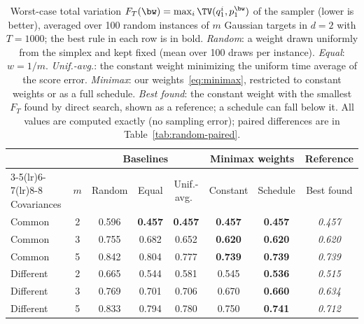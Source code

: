 \begin{table}[t]
\centering
\small
\setlength{\tabcolsep}{5pt}
\begin{tabular}{lc ccc cc c}
\toprule
 & & \multicolumn{3}{c}{Baselines} & \multicolumn{2}{c}{Minimax weights} & Reference \\
\cmidrule(lr){3-5}\cmidrule(lr){6-7}\cmidrule(lr){8-8}
Covariances & $m$ & Random & Equal & Unif.-avg.\ & Constant & Schedule & Best found \\
\midrule
Common & 2 & 0.596 & \textbf{0.457} & \textbf{0.457} & \textbf{0.457} & \textbf{0.457} & \textit{0.457} \\
Common & 3 & 0.755 & 0.682 & 0.652 & \textbf{0.620} & \textbf{0.620} & \textit{0.620} \\
Common & 5 & 0.842 & 0.804 & 0.777 & \textbf{0.739} & \textbf{0.739} & \textit{0.739} \\
\midrule
Different & 2 & 0.665 & 0.544 & 0.581 & 0.545 & \textbf{0.536} & \textit{0.515} \\
Different & 3 & 0.769 & 0.701 & 0.706 & 0.670 & \textbf{0.660} & \textit{0.634} \\
Different & 5 & 0.833 & 0.794 & 0.780 & 0.750 & \textbf{0.741} & \textit{0.712} \\
\bottomrule
\end{tabular}
\caption{Worst-case total variation $F_T(\bw)=\max_i\TV(q_1^i,p_1^{\bw})$ of the sampler (lower is better), averaged over 100 random instances of $m$ Gaussian targets in $d=2$ with $T=1000$; the best rule in each row is in bold. \emph{Random}: a weight drawn uniformly from the simplex and kept fixed (mean over 100 draws per instance). \emph{Equal}: $w=1/m$. \emph{Unif.-avg.}: the constant weight minimizing the uniform time average of the score error. \emph{Minimax}: our weights~\eqref{eq:minimax}, restricted to constant weights or as a full schedule. \emph{Best found}: the constant weight with the smallest $F_T$ found by direct search, shown as a reference; a schedule can fall below it. All values are computed exactly (no sampling error); paired differences are in Table~\ref{tab:random-paired}.}
\label{tab:random}
\end{table}
